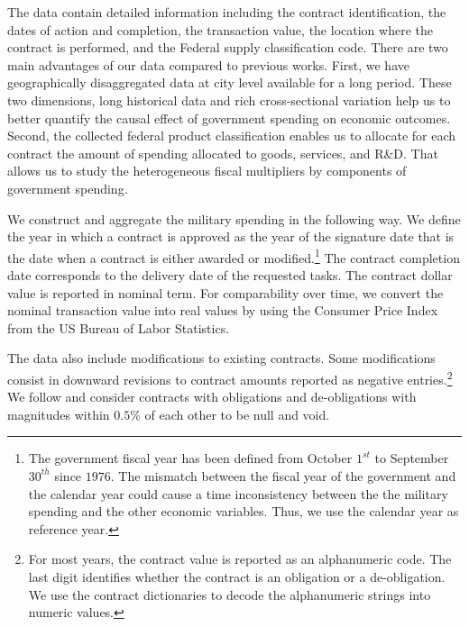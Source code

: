\documentclass[dv_diss_main.tex]{subfiles}
\begin{document}
The data contain detailed information including the contract identification, the dates of action and completion, the transaction value, the location where the contract is performed, and the Federal supply classification code. There are two main advantages of our data compared to previous works. First, we have geographically disaggregated data at city level available for a long period. These two dimensions, long historical data and rich cross-sectional variation help us to better quantify the causal effect of government spending on economic outcomes. Second, the collected federal product classification enables us to allocate for each contract the amount of spending allocated to goods, services, and R\&D. That allows us to study the heterogeneous fiscal multipliers by components of government spending.

We construct and aggregate the military spending in the following way. We define the year in which a contract is approved as the year of the signature date that is the date when a contract is either awarded or modified.\footnote{The government fiscal year has been defined from October $1^{st}$ to September $30^{th}$ since $1976$. The mismatch between the fiscal year of the government and the calendar year could cause a time inconsistency between the the military spending and the other economic variables. Thus, we use the calendar year as reference year.} The contract completion date corresponds to the delivery date of the requested tasks. The contract dollar value is reported in nominal term. For comparability over time, we convert the nominal transaction value into real values by using the Consumer Price Index from the US Bureau of Labor Statistics.

The data also include modifications to existing contracts. Some modifications consist in downward revisions to contract amounts reported as negative entries.\footnote{For most years, the contract value is reported as an alphanumeric code. The last digit identifies whether the contract is an obligation or a de-obligation. We use the contract dictionaries to decode the alphanumeric strings into numeric values.} We follow \cite{Auerbach2020} and consider contracts with obligations and de-obligations with magnitudes within $0.5\%$ of each other to be null and void. 


\iffalse
We follow two approaches to allocate the military spending for a contract across years. The first approach consists of assigning the entire value of the contract to the year in which the contract has been signed. The second approach follows \cite{Auerbach2020} and it smooths the allocation of the contract value over the duration of the contract, computed as the period between the signature date and the completion date.\footnote{As in this second approach, we need to calculate the period passed between the signature and the completion dates, we remove contracts with missing completion dates or with completion dates before the signature dates.} As the empirical analysis is carried at the annual frequency, we then aggregate the value of a contract by the years covered between the signature and the completion years.
\fi 
\end{document}
